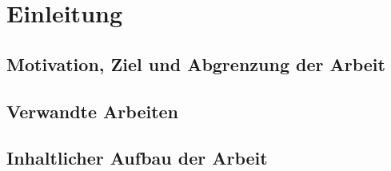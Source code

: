 \chapter{Einleitung}
\label{cha:einleitung}

\section{Motivation, Ziel und Abgrenzung der Arbeit}
\label{sec:motivation}
%

\section{Verwandte Arbeiten}
\label{sec:verwandte-arbeiten}

\section{Inhaltlicher Aufbau der Arbeit}
\label{sec:aufbau}
